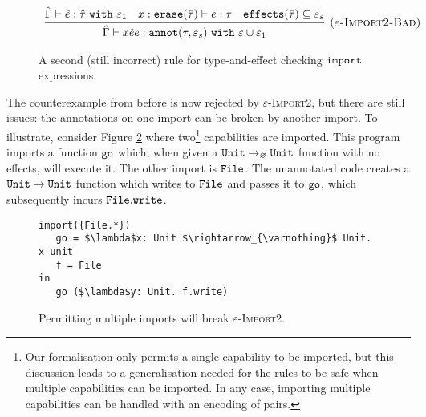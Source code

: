\begin{figure}

\[
\begin{array}{c}

\infer[\textsc{($\varepsilon$-Import2-Bad)}]
	{ \hat \Gamma \vdash {x}{\hat e}{e}: \kwa{annot}(\tau, \varepsilon_s)~\kw{with} \varepsilon \cup \varepsilon_1 }
	{ \hat \Gamma \vdash \hat e: \hat \tau~\kw{with} \varepsilon_1 & x: \kwa{erase}(\hat \tau) \vdash e: \tau & \kwa{effects}(\hat \tau) \subseteq \varepsilon_s}

\end{array}
\]
\vspace{-0.3cm}
\caption{A second (still incorrect) rule for type-and-effect checking $\mathtt{import}$ expressions.}
\vspace{-0.5cm}
\label{fig:import_rule_2}
\end{figure}

The counterexample from before is now rejected by
\textsc{$\varepsilon$-Import2}, but there are still issues: the
annotations on one import can be broken by another import. To
illustrate, consider Figure \ref{fig:rule_import2_counterexample}
where two\footnote{Our formalisation only permits a single capability
  to be imported, but this discussion leads to a generalisation needed
  for the rules to be safe when multiple capabilities can be imported.
  In any case, importing multiple capabilities can be handled with an
  encoding of pairs.} capabilities are imported. This program imports
a function $\mathtt{go}$ which, when given a
$\mathtt{Unit} \rightarrow_{\varnothing} \mathtt{Unit}$ function with no effects, will
execute it. The other import is $\mathtt{File}$. The unannotated code
creates a $\mathtt{Unit} \rightarrow \mathtt{Unit}$ function which writes to
$\mathtt{File}$ and passes it to $\mathtt{go}$, which subsequently incurs
$\mathtt{File.write}$.

\begin{figure}[h]
\vspace{-0.5cm}

\begin{lstlisting}
import({File.*})
   go = $\lambda$x: Unit $\rightarrow_{\varnothing}$ Unit. x unit
   f = File
in
   go ($\lambda$y: Unit. f.write)

\end{lstlisting}

\vspace{-0.5cm}
\caption{Permitting multiple imports will break \textsc{$\varepsilon$-Import2}.}
\vspace{-0.5cm}
\label{fig:rule_import2_counterexample}
\end{figure}

